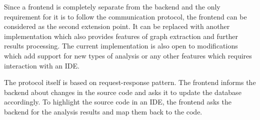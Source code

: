 Since a frontend is completely separate from the backend and the only requirement for it is to follow the communication protocol, the frontend can be considered as the second extension point.
It can be replaced with another implementation which also provides features of graph extraction and further results processing.
The current implementation is also open to modifications which add support for new types of analysis or any other features which requires interaction with an IDE.

The protocol itself is based on request-response pattern.
The frontend informs the backend about changes in the source code and asks it to update the database accordingly.
To highlight the source code in an IDE, the frontend asks the backend for the analysis results and map them back to the code.
